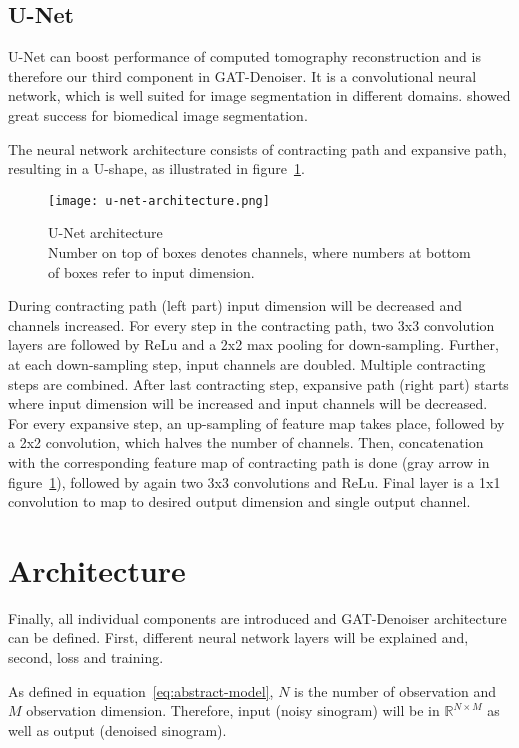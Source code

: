 \subsection{U-Net}
U-Net can boost performance of computed tomography reconstruction and is therefore our third component
in GAT-Denoiser.
It is a convolutional neural network, which is well suited for image segmentation in different domains.
\cite{unet-tomography} showed great success for biomedical image segmentation.

The neural network architecture consists of contracting path and expansive path,
resulting in a U-shape, as illustrated in figure~\ref{fig:u-net-architectue}.

\begin{figure}[H]
  \centering
  \label{fig:u-net-architectue}
  \texttt{[image: u-net-architecture.png]}
  \caption{
    U-Net architecture \cite[p 2, Fig. 1]{unet-tomography} \\
    Number on top of boxes denotes channels, where numbers at bottom of boxes refer to input dimension.
    }
\end{figure}


During contracting path (left part) input dimension will be decreased and channels increased.
For every step in the contracting path, two 3x3 convolution layers are followed by ReLu
and a 2x2 max pooling for down-sampling. Further, at each down-sampling step, input channels are doubled.
Multiple contracting steps are combined. After last contracting step, expansive path (right part) starts
where input dimension will be increased and input channels will be decreased.
For every expansive step, an up-sampling of feature map takes place, followed by a 2x2 convolution, 
which halves the number of channels. Then, concatenation with the corresponding feature
map of contracting path is done (gray arrow in figure~\ref{fig:u-net-architectue}), followed by again two 3x3 convolutions and ReLu.
Final layer is a 1x1 convolution to map to desired output dimension and single output channel.

\section{Architecture}
\label{sec:architecture-GatDenoiser}
Finally, all individual components are introduced and GAT-Denoiser architecture can be defined.
First, different neural network layers will be explained and, second, loss and training.

As defined in equation~\ref{eq:abstract-model}, $N$ is the number of observation and
$M$ observation dimension. 
Therefore, input (noisy sinogram) will be in $\mathbb{R}^{N \times M}$ as well as output (denoised sinogram). 

